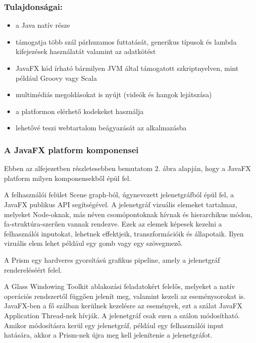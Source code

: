\subsubsection*{Tulajdonságai:}
\begin{itemize}
\item a Java natív része 
\item támogatja több szál párhuzamos futtatását, generikus típusok és lambda kifejezések használatát valamint az adatkötést 
\item JavaFX kód írható bármilyen JVM által támogatott szkriptnyelven, mint például Groovy vagy Scala 
\item multimédiás megoldásokat is nyújt (videók és hangok lejátszása) 
\item a platformon elérhető kodekeket használja 
\item lehetővé teszi webtartalom beágyazását az alkalmazásba
\end{itemize}

\subsubsection*{A JavaFX platform komponensei}

Ebben az alfejezetben részletesebben bemutatom  2. ábra alapján, hogy a JavaFX platform milyen komponensekből épül fel. \cite{javafx, javafx4}



A felhasználói felület Scene graph-ból, úgynevezett jelenetgráfból épül fel, a JavaFX publikus API segítségével.
A jelenetgráf vizuális elemeket tartalmaz, melyeket Node-oknak, más néven csomópontoknak hívnak és hierarchikus módon, fa-struktúra-szerűen vannak rendezve.
Ezek az elemek képesek kezelni a felhasználói inputokat, lehetnek effektjeik, transzformációik és állapotaik.
Ilyen vizuális elem lehet például egy gomb vagy egy szövegmező. 

A Prism egy hardveres gyorsítású grafikus pipeline, amely a jelenetgráf rendereléséért felel.\cite{javafx2}

A Glass Windowing Toolkit ablakozási feladatokért felelős, melyeket a natív operációs rendszertől függően jelenít meg, valamint kezeli az eseménysorokat is.
JavaFX-ben a fő szálban kerülnek kezelésre az események, ezt a szálat JavaFX Application Thread-nek hívják.
A jelenetgráf csak ezen a szálon módosítható.
Amikor módosításra kerül egy jelenetgráf, például egy felhasználói input hatására, akkor a Prism-nek újra meg kell jelenítenie a jelenetgráfot.

